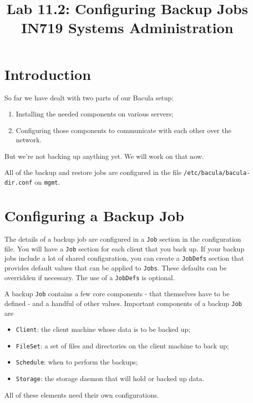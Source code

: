 \documentclass{article}   	%
\title{Lab 11.2:  Configuring Backup Jobs\\ IN719 Systems Administration}
\date{}							%
\begin{document}
\maketitle

\section*{Introduction}
So far we have dealt with two parts of our Bacula setup:
\begin{enumerate}
	\item Installing the needed components on various servers;
	\item Configuring those components to communicate with each other over the network.
\end{enumerate}

But we're not backing up anything yet.  We will work on that now.

All of the backup and restore jobs are configured in the file \texttt{/etc/bacula/bacula-dir.conf} on \texttt{mgmt}.

\section{Configuring a Backup Job}
The details of a backup job are configured in a \texttt{Job} section in the configuration file.  You will have a \texttt{Job} section for each client that you back up.  If your backup jobs include a lot of shared configuration, you can create a \texttt{JobDefs} section that provides default values that can be applied to \texttt{Jobs}.  These defaults can be overridden if necessary.  The use of a \texttt{JobDefs} is optional.

A backup \texttt{Job} contains a few core components - that themselves have to be defined - and a handful of other values.  Important components of a backup \texttt{Job} are

\begin{itemize}
	\item \texttt{Client}: the client machine whose data is to be backed up;
	\item \texttt{FileSet}: a set of files and directories on the client machine to back up;
	\item \texttt{Schedule}: when to perform the backups;
	\item \texttt{Storage}: the storage daemon that will hold or backed up data.
\end{itemize}

All of these elements need their own configurations.
\end{document}
